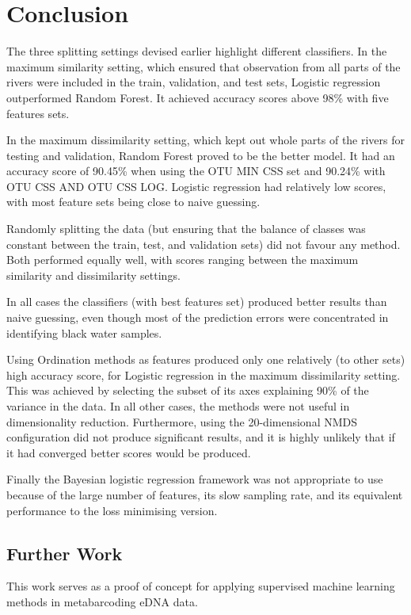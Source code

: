 
\chapter{Conclusion}
The three splitting settings devised earlier highlight different classifiers. 
In the maximum similarity setting, which ensured that observation from all parts of the rivers were included in the train, validation, and test sets, Logistic regression outperformed Random Forest. It achieved accuracy scores above 98\% with five features sets. 

In the maximum dissimilarity setting, which kept out whole parts of the rivers for testing and validation, Random Forest proved to be the better model. It had an accuracy score of 90.45\% when using the OTU MIN CSS set and 90.24\% with OTU CSS AND OTU CSS LOG. Logistic regression had relatively low scores, with most feature sets being close to naive guessing. 

Randomly splitting the data (but ensuring that the balance of classes was constant between the train, test, and validation sets) did not favour any method. Both performed equally well, with scores ranging between the maximum similarity and dissimilarity settings.

In all cases the classifiers (with best features set) produced better results than naive guessing, even though most of the prediction errors were concentrated in identifying black water samples. 

Using Ordination methods as features produced only one relatively (to other sets) high accuracy score, for Logistic regression in the maximum dissimilarity setting. This was achieved by selecting the subset of its axes explaining 90\% of the variance in the data. In all other cases, the methods were not useful in dimensionality reduction. Furthermore, using the 20-dimensional NMDS configuration did not produce significant results, and it is highly unlikely that if it had converged better scores would be produced.

Finally the Bayesian logistic regression framework was not appropriate to use because of the large number of features, its slow sampling rate, and its equivalent performance to the loss minimising version.

\section*{Further Work}
This work serves as a proof of concept for applying supervised machine learning methods in metabarcoding eDNA data. 

